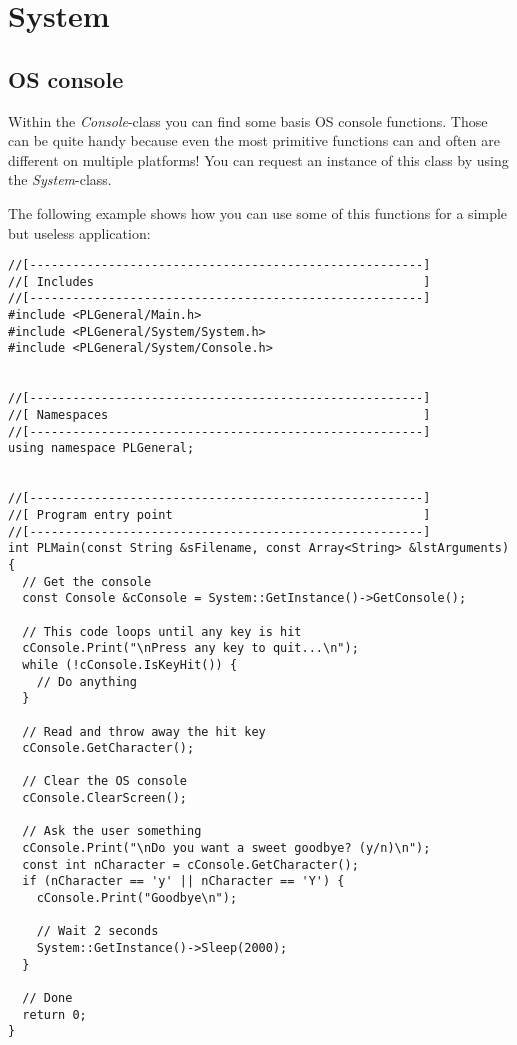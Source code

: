 \chapter{System}




\section{OS console}
Within the \emph{Console}-class you can find some basis OS console functions. Those can be quite handy because even the most primitive functions can and often are different on multiple platforms! You can request an instance of this class by using the \emph{System}-class.

The following example shows how you can use some of this functions for a simple but useless application:

\begin{lstlisting}[caption=OS console usage example]
//[-------------------------------------------------------]
//[ Includes                                              ]
//[-------------------------------------------------------]
#include <PLGeneral/Main.h>
#include <PLGeneral/System/System.h>
#include <PLGeneral/System/Console.h>


//[-------------------------------------------------------]
//[ Namespaces                                            ]
//[-------------------------------------------------------]
using namespace PLGeneral;


//[-------------------------------------------------------]
//[ Program entry point                                   ]
//[-------------------------------------------------------]
int PLMain(const String &sFilename, const Array<String> &lstArguments)
{
  // Get the console
  const Console &cConsole = System::GetInstance()->GetConsole();

  // This code loops until any key is hit
  cConsole.Print("\nPress any key to quit...\n");
  while (!cConsole.IsKeyHit()) {
    // Do anything
  }

  // Read and throw away the hit key
  cConsole.GetCharacter();

  // Clear the OS console
  cConsole.ClearScreen();

  // Ask the user something
  cConsole.Print("\nDo you want a sweet goodbye? (y/n)\n");
  const int nCharacter = cConsole.GetCharacter();
  if (nCharacter == 'y' || nCharacter == 'Y') {
    cConsole.Print("Goodbye\n");

    // Wait 2 seconds
    System::GetInstance()->Sleep(2000);
  }

  // Done
  return 0;
}
\end{lstlisting}
